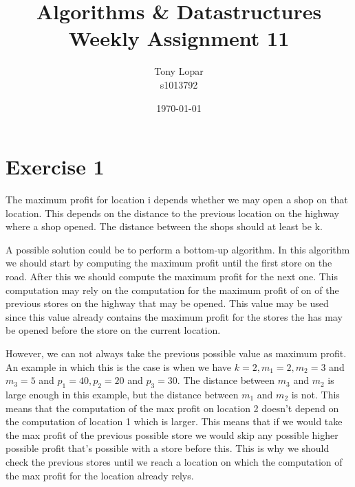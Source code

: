 \documentclass{article}
\begin{document}
\title{Algorithms \& Datastructures \\ Weekly Assignment 11}
\date{\today}
\author{Tony Lopar \\ s1013792}
\maketitle
\section*{Exercise 1}
The maximum profit for location i depends whether we may open a shop on that location. This depends on the distance to the previous location on the highway where a shop opened. The distance between the shops should at least be k.

A possible solution could be to perform a bottom-up algorithm. In this algorithm we should start by computing the maximum profit until the first store on the road. After this we should compute the maximum profit for the next one. This computation may rely on the computation for the maximum profit of on of the previous stores on the highway that may be opened. This value may be used since this value already contains the maximum profit for the stores the has may be opened before the store on the current location.

However, we can not always take the previous possible value as maximum profit. An example in which this is the case is when we have $k = 2, m_1 = 2, m_2 = 3$ and $m_3 = 5$ and $p_1 = 40, p_2 = 20$ and $p_3 = 30$. The distance between $m_3$ and $m_2$ is large enough in this example, but the distance between $m_1$ and $m_2$ is not. This means that the computation of the max profit on location 2 doesn't depend on the computation of location 1 which is larger. This means that if we would take the max profit of the previous possible store we would skip any possible higher possible profit that's possible with a store before this. This is why we should check the previous stores until we reach a location on which the computation of the max profit for the location already relys.
\end{document}
